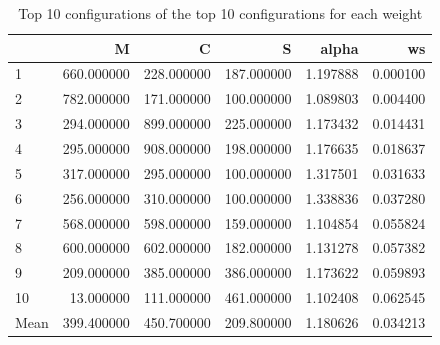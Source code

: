 \begin{frame}
    \begin{table}
        \caption{Top 10 configurations of the top 10 configurations for each weight}
    \begin{tabular}{lrrrrr}
    \toprule
     & M & C & S & alpha & ws \\
    \midrule
    1 & 660.000000 & 228.000000 & 187.000000 & 1.197888 & 0.000100 \\
    2 & 782.000000 & 171.000000 & 100.000000 & 1.089803 & 0.004400 \\
    3 & 294.000000 & 899.000000 & 225.000000 & 1.173432 & 0.014431 \\
    4 & 295.000000 & 908.000000 & 198.000000 & 1.176635 & 0.018637 \\
    5 & 317.000000 & 295.000000 & 100.000000 & 1.317501 & 0.031633 \\
    6 & 256.000000 & 310.000000 & 100.000000 & 1.338836 & 0.037280 \\
    7 & 568.000000 & 598.000000 & 159.000000 & 1.104854 & 0.055824 \\
    8& 600.000000 & 602.000000 & 182.000000 & 1.131278 & 0.057382 \\
    9& 209.000000 & 385.000000 & 386.000000 & 1.173622 & 0.059893 \\
    10& 13.000000 & 111.000000 & 461.000000 & 1.102408 & 0.062545 \\
    \midrule
    Mean & 399.400000 & 450.700000 & 209.800000 & 1.180626 & 0.034213 \\
    \bottomrule
    \end{tabular}
    \end{table}
\end{frame}
